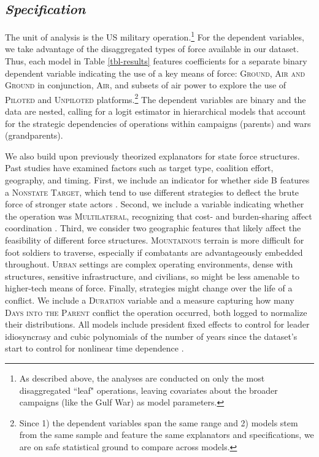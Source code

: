 \documentclass[fleqn,12pt]{article}
\begin{document}
\subsection*{\textit{Specification}}
The unit of analysis is the US military operation.\footnote{As described above, the analyses are conducted on only the most disaggregated ``leaf" operations, leaving covariates about the broader campaigns (like the Gulf War) as model parameters.} For the dependent variables, we take advantage of the disaggregated types of force available in our dataset. Thus, each model in Table \ref{tbl-results} features coefficients for a separate binary dependent variable indicating the use of a key means of force: \textsc{Ground}, \textsc{Air and Ground} in conjunction, \textsc{Air}, and subsets of air power to explore the use of \textsc{Piloted} and \textsc{Unpiloted} platforms.\footnote{Since 1) the dependent variables span the same range and 2) models stem from the same sample and feature the same explanators and specifications, we are on safe statistical ground to compare across models.} The dependent variables are binary and the data are nested, calling for a logit estimator in hierarchical models that account for the strategic dependencies of operations within campaigns (parents) and wars (grandparents).

We also build upon previously theorized explanators for state force structures. Past studies have examined factors such as target type, coalition effort, geography, and timing. First, we include an indicator for whether side B features a \textsc{Nonstate Target}, which tend to use different strategies to deflect the brute force of stronger state actors \citep{arreguin-toft_howweakwin_2001}. Second, we include a variable indicating whether the operation was \textsc{Multilateral}, recognizing that cost- and burden-sharing affect coordination \citep{cappellazielinski_understandingbattlefieldcoalitions_2022}. Third, we consider two geographic features that likely affect the feasibility of different force structures. \textsc{Mountainous} terrain is more difficult for foot soldiers to traverse, especially if combatants are advantageously embedded throughout. \textsc{Urban} settings are complex operating environments, dense with structures, sensitive infrastructure, and civilians, so might be less amenable to higher-tech means of force. Finally, strategies might change over the life of a conflict. We include a \textsc{Duration} variable and a measure capturing how many \textsc{Days into the Parent} conflict the operation occurred, both logged to normalize their distributions. All models include president fixed effects to control for leader idiosyncrasy and cubic polynomials of the number of years since the dataset's start to control for nonlinear time dependence \citep{carter_backfuturemodeling_2010}.
\end{document}
